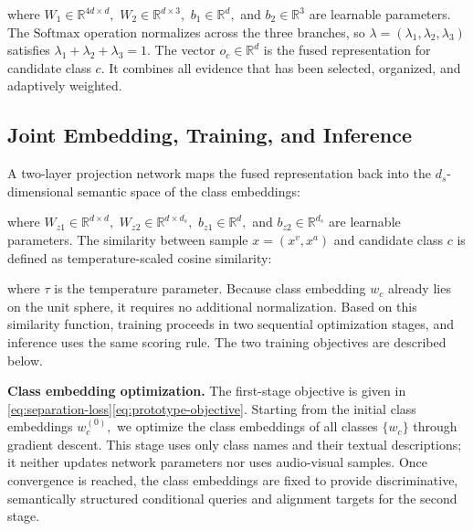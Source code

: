 


\noindent\unskip where ${W}_{1}\in {\mathbb{R}}^{4d\times d},$ ${W}_{2}\in {\mathbb{R}}^{d\times 3},$ ${b}_{1}\in {\mathbb{R}}^{d},$ and ${b}_{2}\in {\mathbb{R}}^{3}$ are learnable parameters. The $\mathrm{Softmax}$ operation normalizes across the three branches, so $\lambda =({\lambda }_{1},{\lambda }_{2},{\lambda }_{3})$ satisfies ${\lambda }_{1}+{\lambda }_{2}+{\lambda }_{3}=1.$ The vector ${o}_{c}\in {\mathbb{R}}^{d}$ is the fused representation for candidate class $c.$ It combines all evidence that has been selected, organized, and adaptively weighted.

\subsection{Joint Embedding, Training, and Inference}\label{sec:joint-embedding-training-and-inference}

A two-layer projection network maps the fused representation back into the ${d}_{s}$-dimensional semantic space of the class embeddings:


\noindent\unskip where ${W}_{z1}\in {\mathbb{R}}^{d\times d},$ ${W}_{z2}\in {\mathbb{R}}^{d\times {d}_{s}},$ ${b}_{z1}\in {\mathbb{R}}^{d},$ and ${b}_{z2}\in {\mathbb{R}}^{{d}_{s}}$ are learnable parameters. The similarity between sample $x=({x}^{v},{x}^{a})$ and candidate class $c$ is defined as temperature-scaled cosine similarity:


\noindent\unskip where $\tau $ is the temperature parameter. Because class embedding ${w}_{c}$ already lies on the unit sphere, it requires no additional normalization. Based on this similarity function, training proceeds in two sequential optimization stages, and inference uses the same scoring rule. The two training objectives are described below.

\textbf{Class embedding optimization. }The first-stage objective is given in \eqref{eq:separation-loss}\textendash{}\eqref{eq:prototype-objective}. Starting from the initial class embeddings ${w}_{c}^{(0)},$ we optimize the class embeddings of all classes $\{{w}_{c}\}$ through gradient descent. This stage uses only class names and their textual descriptions; it neither updates network parameters nor uses audio-visual samples. Once convergence is reached, the class embeddings are fixed to provide discriminative, semantically structured conditional queries and alignment targets for the second stage.

